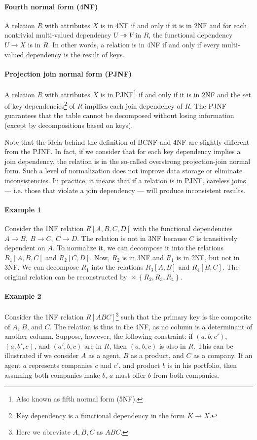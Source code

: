 \paragraph{Fourth normal form (4NF)}  A relation $R$ with attributes $X$ is in 4NF if
and only if it is in 2NF and for each nontrivial multi-valued dependency $U \twoheadrightarrow
V$ in $R$, the functional dependency $U \to X$ is in $R$.  In other words, a relation is
in 4NF if and only if every multi-valued dependency is the result of keys.

\paragraph{Projection join normal form (PJNF)} A relation $R$ with attributes $X$ is in
PJNF\footnote{Also known as fifth normal form (5NF).} if and only if it is in 2NF and
the set of key dependencies\footnote{Key dependency is a functional dependency in the form
$K \to X$.} of $R$ impllies each join dependency of $R$.  The PJNF guarantees that the
table cannot be decomposed without losing information (except by decompositions based on
keys).

Note that the ideia behind the definition of BCNF and 4NF are slightly different from the
PJNF.  In fact, if we consider that for each key dependency implies a join dependency, the
relation is in the so-called overstrong projection-join normal
form.  Such a level of normalization does not improve data storage
or eliminate inconsistencies.  In practice, it means that if a relation is in PJNF,
careless joins --- i.e. those that violate a join dependency --- will produce
inconsistent results.

\paragraph{Example 1}  Consider the 1NF relation $R[A, B, C, D]$ with the functional
dependencies $A \to B,~B \to C,~C \to D$.  The relation is not in 3NF because $C$ is
transitively dependent on $A$.  To normalize it, we can decompose it into the
relations $R_1[A, B, C]$ and $R_2[C, D]$.  Now, $R_2$ is in 3NF and $R_1$ is in 2NF, but
not in 3NF.  We can decompose $R_1$ into the relations $R_3[A, B]$ and $R_4[B, C]$.
The original relation can be reconstructed by $\bowtie \left\{ R_2, R_3, R_4 \right\}$.

\paragraph{Example 2} Consider the 1NF relation $R[ABC]$\footnote{Here we abreviate ${A,
B, C}$ as $ABC$.} such that the primary key is the composite of $A$, $B$, and $C$.  The
relation is thus in the 4NF, as no column is a determinant of another column.  Suppose,
however, the following constraint: if $(a, b, c')$, $(a, b', c)$, and $(a', b, c)$ are in
$R$, then $(a, b, c)$ is also in $R$.  This can be illustrated if we consider $A$ as a
agent, $B$ as a product, and $C$ as a company.  If an agent $a$ represents companies $c$ and
$c'$, and product $b$ is in his portfolio, then assuming both companies make $b$, $a$
must offer $b$ from both companies.

